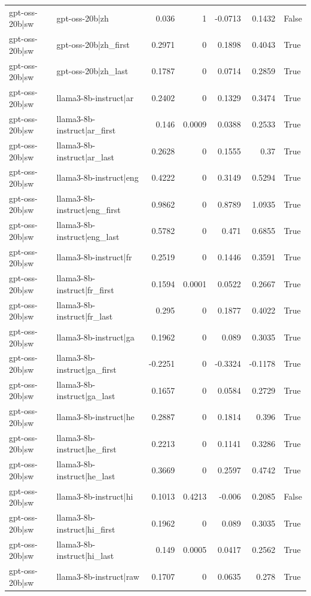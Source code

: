\begin{table}
\begin{tabular}{l l r r r r l}
gpt-oss-20b|sw & gpt-oss-20b|zh & 0.036 & 1 & -0.0713 & 0.1432 & False \\
gpt-oss-20b|sw & gpt-oss-20b|zh_first & 0.2971 & 0 & 0.1898 & 0.4043 & True \\
gpt-oss-20b|sw & gpt-oss-20b|zh_last & 0.1787 & 0 & 0.0714 & 0.2859 & True \\
gpt-oss-20b|sw & llama3-8b-instruct|ar & 0.2402 & 0 & 0.1329 & 0.3474 & True \\
gpt-oss-20b|sw & llama3-8b-instruct|ar_first & 0.146 & 0.0009 & 0.0388 & 0.2533 & True \\
gpt-oss-20b|sw & llama3-8b-instruct|ar_last & 0.2628 & 0 & 0.1555 & 0.37 & True \\
gpt-oss-20b|sw & llama3-8b-instruct|eng & 0.4222 & 0 & 0.3149 & 0.5294 & True \\
gpt-oss-20b|sw & llama3-8b-instruct|eng_first & 0.9862 & 0 & 0.8789 & 1.0935 & True \\
gpt-oss-20b|sw & llama3-8b-instruct|eng_last & 0.5782 & 0 & 0.471 & 0.6855 & True \\
gpt-oss-20b|sw & llama3-8b-instruct|fr & 0.2519 & 0 & 0.1446 & 0.3591 & True \\
gpt-oss-20b|sw & llama3-8b-instruct|fr_first & 0.1594 & 0.0001 & 0.0522 & 0.2667 & True \\
gpt-oss-20b|sw & llama3-8b-instruct|fr_last & 0.295 & 0 & 0.1877 & 0.4022 & True \\
gpt-oss-20b|sw & llama3-8b-instruct|ga & 0.1962 & 0 & 0.089 & 0.3035 & True \\
gpt-oss-20b|sw & llama3-8b-instruct|ga_first & -0.2251 & 0 & -0.3324 & -0.1178 & True \\
gpt-oss-20b|sw & llama3-8b-instruct|ga_last & 0.1657 & 0 & 0.0584 & 0.2729 & True \\
gpt-oss-20b|sw & llama3-8b-instruct|he & 0.2887 & 0 & 0.1814 & 0.396 & True \\
gpt-oss-20b|sw & llama3-8b-instruct|he_first & 0.2213 & 0 & 0.1141 & 0.3286 & True \\
gpt-oss-20b|sw & llama3-8b-instruct|he_last & 0.3669 & 0 & 0.2597 & 0.4742 & True \\
gpt-oss-20b|sw & llama3-8b-instruct|hi & 0.1013 & 0.4213 & -0.006 & 0.2085 & False \\
gpt-oss-20b|sw & llama3-8b-instruct|hi_first & 0.1962 & 0 & 0.089 & 0.3035 & True \\
gpt-oss-20b|sw & llama3-8b-instruct|hi_last & 0.149 & 0.0005 & 0.0417 & 0.2562 & True \\
gpt-oss-20b|sw & llama3-8b-instruct|raw & 0.1707 & 0 & 0.0635 & 0.278 & True \\

\end{tabular}
\end{table}
